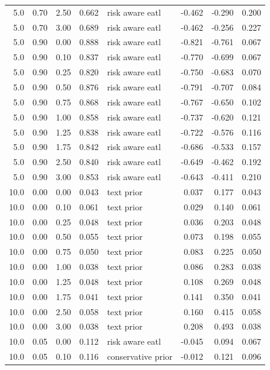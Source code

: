 \begin{longtable}{rrrrlrrr}
5.0 & 0.70 & 2.50 & 0.662 & risk aware eatl & -0.462 & -0.290 & 0.200 \\
5.0 & 0.70 & 3.00 & 0.689 & risk aware eatl & -0.462 & -0.256 & 0.227 \\
5.0 & 0.90 & 0.00 & 0.888 & risk aware eatl & -0.821 & -0.761 & 0.067 \\
5.0 & 0.90 & 0.10 & 0.837 & risk aware eatl & -0.770 & -0.699 & 0.067 \\
5.0 & 0.90 & 0.25 & 0.820 & risk aware eatl & -0.750 & -0.683 & 0.070 \\
5.0 & 0.90 & 0.50 & 0.876 & risk aware eatl & -0.791 & -0.707 & 0.084 \\
5.0 & 0.90 & 0.75 & 0.868 & risk aware eatl & -0.767 & -0.650 & 0.102 \\
5.0 & 0.90 & 1.00 & 0.858 & risk aware eatl & -0.737 & -0.620 & 0.121 \\
5.0 & 0.90 & 1.25 & 0.838 & risk aware eatl & -0.722 & -0.576 & 0.116 \\
5.0 & 0.90 & 1.75 & 0.842 & risk aware eatl & -0.686 & -0.533 & 0.157 \\
5.0 & 0.90 & 2.50 & 0.840 & risk aware eatl & -0.649 & -0.462 & 0.192 \\
5.0 & 0.90 & 3.00 & 0.853 & risk aware eatl & -0.643 & -0.411 & 0.210 \\
10.0 & 0.00 & 0.00 & 0.043 & text prior & 0.037 & 0.177 & 0.043 \\
10.0 & 0.00 & 0.10 & 0.061 & text prior & 0.029 & 0.140 & 0.061 \\
10.0 & 0.00 & 0.25 & 0.048 & text prior & 0.036 & 0.203 & 0.048 \\
10.0 & 0.00 & 0.50 & 0.055 & text prior & 0.073 & 0.198 & 0.055 \\
10.0 & 0.00 & 0.75 & 0.050 & text prior & 0.083 & 0.225 & 0.050 \\
10.0 & 0.00 & 1.00 & 0.038 & text prior & 0.086 & 0.283 & 0.038 \\
10.0 & 0.00 & 1.25 & 0.048 & text prior & 0.108 & 0.269 & 0.048 \\
10.0 & 0.00 & 1.75 & 0.041 & text prior & 0.141 & 0.350 & 0.041 \\
10.0 & 0.00 & 2.50 & 0.058 & text prior & 0.160 & 0.415 & 0.058 \\
10.0 & 0.00 & 3.00 & 0.038 & text prior & 0.208 & 0.493 & 0.038 \\
10.0 & 0.05 & 0.00 & 0.112 & risk aware eatl & -0.045 & 0.094 & 0.067 \\
10.0 & 0.05 & 0.10 & 0.116 & conservative prior & -0.012 & 0.121 & 0.096 \\

\end{longtable}

